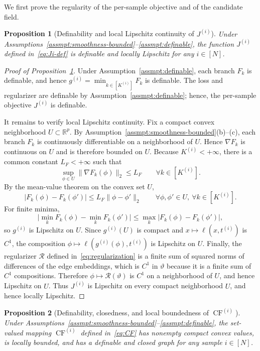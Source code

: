 \documentclass[11pt, letterpaper, oneside, reqno]{amsart}
\newcommand{\R}{\mathbb{R}}
\newtheorem{proposition}{Proposition}
\begin{document}
We first prove the regularity of the per-sample objective and of the candidate field.

\begin{proposition}[Definability and local Lipschitz continuity of $J^{(i)}$]\label{prop:locally-Lipschitz-Ji}
Under Assumptions~\ref{assmpt:smoothness-bounded}--\ref{assmpt:definable}, the function $J^{(i)}$ defined in~\eqref{eq:Ji-def} is definable and locally Lipschitz for any $i\in[N]$.
\end{proposition}

\begin{proof}[Proof of Proposition~\ref{prop:locally-Lipschitz-Ji}]
Under Assumption~\ref{assmpt:definable}, each branch $F_k$ is definable, and hence $g^{(i)}=\min_{k\in[K^{(i)}]}F_k$ is definable. The loss and regularizer are definable by Assumption~\ref{assmpt:definable}; hence, the per-sample objective $J^{(i)}$ is definable.

It remains to verify local Lipschitz continuity. Fix a compact convex neighborhood $U\subset\R^p$. By Assumption~\ref{assmpt:smoothness-bounded}(b)--(c), each branch $F_k$ is continuously differentiable on a neighborhood of $U$. Hence $\nabla F_k$ is continuous on $U$ and is therefore bounded on $U$. Because $K^{(i)}<+\infty$, there is a common constant $L_F<+\infty$ such that
\[
\sup_{\phi\in U}\|\nabla F_k(\phi)\|_2\le L_F
\qquad \forall k\in[K^{(i)}].
\]
By the mean-value theorem on the convex set $U$,
\[
|F_k(\phi)-F_k(\phi')|\le L_F\|\phi-\phi'\|_2
\qquad \forall \phi,\phi'\in U,\ \forall k\in[K^{(i)}].
\]
For finite minima,
\[
\bigl|\min_k F_k(\phi)-\min_k F_k(\phi')\bigr|
\le \max_k |F_k(\phi)-F_k(\phi')|,
\]
so $g^{(i)}$ is Lipschitz on $U$. Since $g^{(i)}(U)$ is compact and $x\mapsto \ell(x,t^{(i)})$ is $C^1$, the composition $\phi\mapsto \ell(g^{(i)}(\phi),t^{(i)})$ is Lipschitz on $U$. Finally, the regularizer $\mathcal R$ defined in~\eqref{eq:regularization} is a finite sum of squared norms of differences of the edge embeddings, which is $C^1$ in $\vartheta$ because it is a finite sum of $C^1$ compositions. Therefore $\phi\mapsto\mathcal R(\vartheta)$ is $C^1$ on a neighborhood of $U$, and hence Lipschitz on $U$. Thus $J^{(i)}$ is Lipschitz on every compact neighborhood $U$, and hence locally Lipschitz.
\end{proof}

\begin{proposition}[Definability, closedness, and local boundedness of $\operatorname{CF}^{(i)}$]\label{prop:locally-bounded-CF}
Under Assumptions~\ref{assmpt:smoothness-bounded}--\ref{assmpt:definable}, the set-valued mapping $\operatorname{CF}^{(i)}$ defined in~\eqref{eq:CF} has nonempty compact convex values, is locally bounded, and has a definable and closed graph for any sample $i\in[N]$.
\end{proposition}
\end{document}
